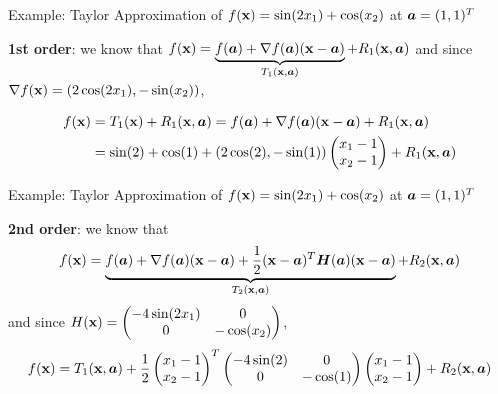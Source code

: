 \documentclass[11pt,compress,t,notes=noshow, xcolor=table]{beamer}
\begin{document}
\begin{frame2}{Example: Taylor Approximation of $\fx = \sin(2\MakeLowercase{x}_1) + \cos(\MakeLowercase{x}_2)$ at $\bm{\MakeLowercase{a}} = (1, 1)^T$}
\,\\
\begin{footnotesize}
\textbf{1st order}: we know that
    $
    f(\mathbf{x}) = \underbrace{f(\bm{a}) + \nabla f(\bm{a}) (\mathbf{x} - \bm{a})}_{T_1(\mathbf{x}, \bm{a})} + R_1(\mathbf{x},\bm{a})
    $
and since  $\nabla f(\mathbf{x}) = \left(2\cos(2x_1), -\sin(x_2)\right)$,

    \begin{align*}
        f(\mathbf{x}) &= T_1(\mathbf{x}) + R_1(\mathbf{x}, \bm{a}) = f(\bm{a}) + \nabla f(\bm{a}) (\mathbf{x} - \bm{a}) + R_1(\mathbf{x}, \bm{a})\\
        &= \sin(2) + \cos(1) + (2 \cos(2), - \sin(1))\begin{pmatrix} x_1 - 1 \\ x_2 - 1\end{pmatrix} + R_1(\mathbf{x}, \bm{a})
    \end{align*}
\end{footnotesize}

\vspace*{-0.5\baselineskip}

{}


\end{frame2}

\begin{frame2}{Example: Taylor Approximation of $\fx = \sin(2\MakeLowercase{x}_1) + \cos(\MakeLowercase{x}_2)$ at $\bm{\MakeLowercase{a}} = (1, 1)^T$}
\,\\
\begin{footnotesize}
\textbf{2nd order}: we know that
    $$
    f(\mathbf{x}) = \underbrace{f(\bm{a}) + \nabla f(\bm{a}) (\mathbf{x} - \bm{a}) + \frac{1}{2}(\mathbf{x} - \bm{a})^T\bm{H}(\bm{a})(\mathbf{x} - \bm{a})}_{T_2(\mathbf{x}, \bm{a})} + R_2(\mathbf{x},\bm{a})
    $$
    and since $H(\mathbf{x}) = \begin{pmatrix} -4 \sin(2x_1) & 0 \\ 0 & -\cos(x_2) \end{pmatrix}$,
    $$
        f(\mathbf{x}) = T_1(\mathbf{x}, \bm{a}) + \frac{1}{2}\begin{pmatrix}x_1 - 1 \\ x_2 - 1 \end{pmatrix}^T \begin{pmatrix} -4 \sin(2) & 0 \\ 0 & -\cos(1) \end{pmatrix} \begin{pmatrix}x_1 - 1 \\ x_2 - 1 \end{pmatrix} + R_2(\mathbf{x}, \bm{a})
    $$
\end{footnotesize}

\vspace*{-0.5\baselineskip}

\splitVCC
    {
    }
    {
    }

\end{frame2}
\endlecture
\end{document}
